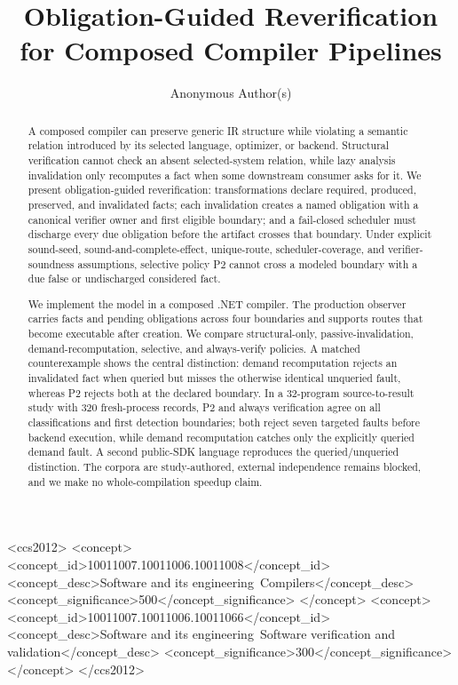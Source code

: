 \documentclass[sigplan,screen,review,anonymous]{acmart}
\begin{document}
\title{Obligation-Guided Reverification for Composed Compiler Pipelines}
\author{Anonymous Author(s)}

\begin{abstract}
A composed compiler can preserve generic IR structure while violating a semantic relation introduced by its selected language, optimizer, or backend. Structural verification cannot check an absent selected-system relation, while lazy analysis invalidation only recomputes a fact when some downstream consumer asks for it. We present obligation-guided reverification: transformations declare required, produced, preserved, and invalidated facts; each invalidation creates a named obligation with a canonical verifier owner and first eligible boundary; and a fail-closed scheduler must discharge every due obligation before the artifact crosses that boundary. Under explicit sound-seed, sound-and-complete-effect, unique-route, scheduler-coverage, and verifier-soundness assumptions, selective policy P2 cannot cross a modeled boundary with a due false or undischarged considered fact.

We implement the model in a composed .NET compiler. The production observer carries facts and pending obligations across four boundaries and supports routes that become executable after creation. We compare structural-only, passive-invalidation, demand-recomputation, selective, and always-verify policies. A matched counterexample shows the central distinction: demand recomputation rejects an invalidated fact when queried but misses the otherwise identical unqueried fault, whereas P2 rejects both at the declared boundary. In a 32-program source-to-result study with 320 fresh-process records, P2 and always verification agree on all classifications and first detection boundaries; both reject seven targeted faults before backend execution, while demand recomputation catches only the explicitly queried demand fault. A second public-SDK language reproduces the queried/unqueried distinction. The corpora are study-authored, external independence remains blocked, and we make no whole-compilation speedup claim.
\end{abstract}

\begin{CCSXML}
<ccs2012>
 <concept>
  <concept_id>10011007.10011006.10011008</concept_id>
  <concept_desc>Software and its engineering~Compilers</concept_desc>
  <concept_significance>500</concept_significance>
 </concept>
 <concept>
  <concept_id>10011007.10011006.10011066</concept_id>
  <concept_desc>Software and its engineering~Software verification and validation</concept_desc>
  <concept_significance>300</concept_significance>
 </concept>
</ccs2012>
\end{CCSXML}
\maketitle
\end{document}
